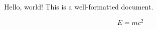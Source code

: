 \documentclass{article}
\begin{document}
Hello, world! This is a well-formatted document.

\[
  E = mc^2
\]
\end{document}
